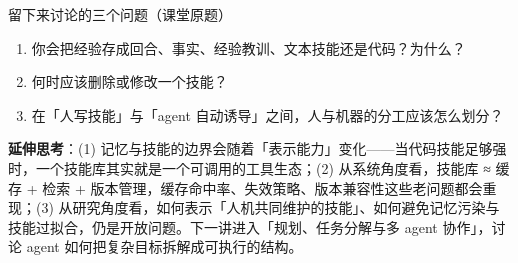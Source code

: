 ﻿\documentclass[a4paper]{article}
\begin{document}
\begin{importantbox}{留下来讨论的三个问题（课堂原题）}
\begin{enumerate}
\item 你会把经验存成回合、事实、经验教训、文本技能还是代码？为什么？
\item 何时应该删除或修改一个技能？
\item 在「人写技能」与「agent 自动诱导」之间，人与机器的分工应该怎么划分？
\end{enumerate}
\end{importantbox}

\textbf{延伸思考}：(1) 记忆与技能的边界会随着「表示能力」变化——当代码技能足够强时，一个技能库其实就是一个可调用的工具生态；(2) 从系统角度看，技能库 ≈ 缓存 + 检索 + 版本管理，缓存命中率、失效策略、版本兼容性这些老问题都会重现；(3) 从研究角度看，如何表示「人机共同维护的技能」、如何避免记忆污染与技能过拟合，仍是开放问题。下一讲进入「规划、任务分解与多 agent 协作」，讨论 agent 如何把复杂目标拆解成可执行的结构。
\end{document}
